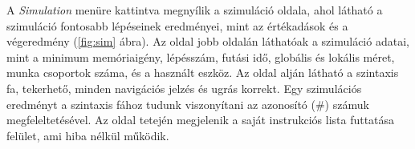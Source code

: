 A \textit{Simulation} menüre kattintva megnyílik a szimuláció oldala, ahol látható a szimuláció fontosabb lépéseinek eredményei, mint az értékadások és a végeredmény (\ref{fig:sim} ábra). Az oldal jobb oldalán láthatóak a szimuláció adatai, mint a minimum memóriaigény, lépésszám, futási idő, globális és lokális méret, munka csoportok száma, és a használt eszköz. Az oldal alján látható a szintaxis fa, tekerhető, minden navigációs jelzés és ugrás korrekt. Egy szimulációs eredményt a szintaxis fához tudunk viszonyítani az azonosító (\#) számuk megfeleltetésével.
Az oldal tetején megjelenik a saját instrukciós lista futtatása felület, ami hiba nélkül működik.